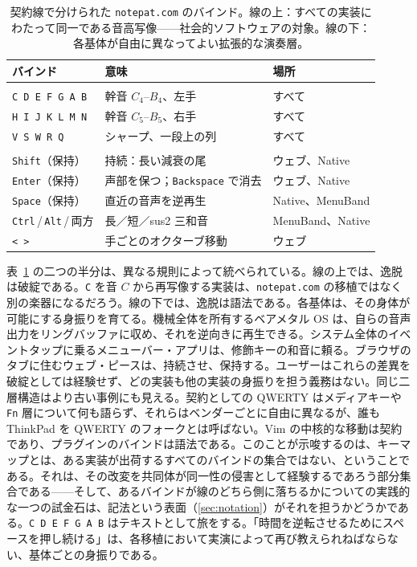 \documentclass[10pt,letterpaper,twocolumn]{article}
\begin{document}
\begin{table}[t]
\footnotesize
\setlength{\tabcolsep}{3pt}
\renewcommand{\arraystretch}{1.05}
\centering
\caption{契約線で分けられた \texttt{notepat.com} のバインド。線の上：すべての実装にわたって同一である音高写像——社会的ソフトウェアの対象。線の下：各基体が自由に異なってよい拡張的な演奏層。}
\label{tab:contract-line}
\begin{tabularx}{\columnwidth}{@{}>{\RaggedRight}p{}>{\RaggedRight}X>{\RaggedRight\arraybackslash}p{}@{}}
\toprule
\textbf{バインド} & \textbf{意味} & \textbf{場所} \\
\midrule
\multicolumn{3}{@{}l}{\emph{音高の契約}} \\[0.1em]
\texttt{C D E F G A B} & 幹音 $C_4$--$B_4$、左手 & すべて \\
\texttt{H I J K L M N} & 幹音 $C_5$--$B_5$、右手 & すべて \\
\texttt{V S W R Q} & シャープ、一段上の列 & すべて \\
\midrule
\multicolumn{3}{@{}l}{\emph{拡張的な演奏層}} \\[0.1em]
\texttt{Shift}（保持） & 持続：長い減衰の尾 & ウェブ、Native \\
\texttt{Enter}（保持） & 声部を保つ；\texttt{Backspace} で消去 & ウェブ、Native \\
\texttt{Space}（保持） & 直近の音声を逆再生 & Native、MenuBand \\
\texttt{Ctrl}\,/\,\texttt{Alt}\,/\,両方 & 長／短／sus2 三和音 & MenuBand、Native \\
\texttt{<}~\texttt{>} & 手ごとのオクターブ移動 & ウェブ \\
\bottomrule
\end{tabularx}
\end{table}

表~\ref{tab:contract-line} の二つの半分は、異なる規則によって統べられている。線の上では、逸脱は破綻である。\texttt{C} を音 $C$ から再写像する実装は、\texttt{notepat.com} の移植ではなく別の楽器になるだろう。線の下では、逸脱は語法である。各基体は、その身体が可能にする身振りを育てる。機械全体を所有するベアメタル OS は、自らの音声出力をリングバッファに収め、それを逆向きに再生できる。システム全体のイベントタップに乗るメニューバー・アプリは、修飾キーの和音に頼る。ブラウザのタブに住むウェブ・ピースは、持続させ、保持する。ユーザーはこれらの差異を破綻としては経験せず、どの実装も他の実装の身振りを担う義務はない。同じ二層構造はより古い事例にも見える。契約としての QWERTY はメディアキーや \texttt{Fn} 層について何も語らず、それらはベンダーごとに自由に異なるが、誰も ThinkPad を QWERTY のフォークとは呼ばない。Vim の中核的な移動は契約であり、プラグインのバインドは語法である。このことが示唆するのは、キーマップとは、ある実装が出荷するすべてのバインドの集合ではない、ということである。それは、その改変を共同体が同一性の侵害として経験するであろう部分集合である——そして、あるバインドが線のどちら側に落ちるかについての実践的な一つの試金石は、記法という表面（\textsection\ref{sec:notation}）がそれを担うかどうかである。\texttt{C D E F G A B} はテキストとして旅をする。「時間を逆転させるためにスペースを押し続ける」は、各移植において実演によって再び教えられねばならない、基体ごとの身振りである。
\end{document}
